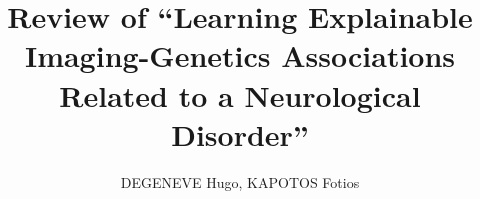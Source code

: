 \documentclass{article}
\begin{document}
\title{Review of ``Learning Explainable Imaging-Genetics Associations Related to a Neurological Disorder''}
\author{DEGENEVE Hugo, KAPOTOS Fotios}
\maketitle
\thispagestyle{empty}




\printbibliography
\end{document}
